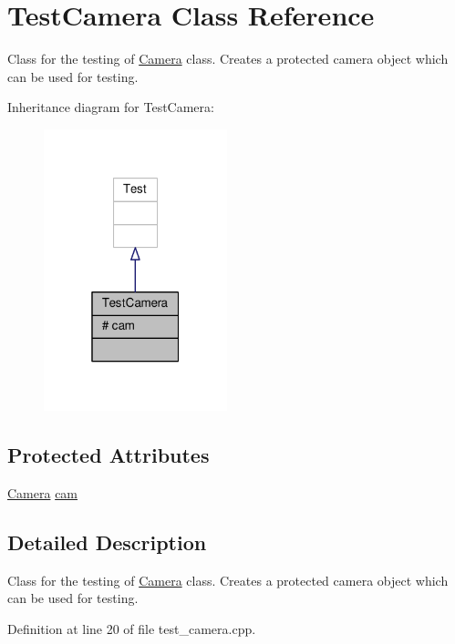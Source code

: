 \hypertarget{class_test_camera}{}\section{Test\+Camera Class Reference}
\label{class_test_camera}


Class for the testing of \hyperlink{class_camera}{Camera} class. Creates a protected camera object which can be used for testing.  




Inheritance diagram for Test\+Camera\+:
\nopagebreak
\begin{figure}[H]
\begin{center}
\leavevmode
\includegraphics[width=151pt]{class_test_camera__inherit__graph}
\end{center}
\end{figure}
\subsection*{Protected Attributes}
\begin{DoxyCompactItemize}
\item 
\hyperlink{class_camera}{Camera} \hyperlink{class_test_camera_ac1abc17c2f7f776456583bc3a60db3a9}{cam}
\end{DoxyCompactItemize}


\subsection{Detailed Description}
Class for the testing of \hyperlink{class_camera}{Camera} class. Creates a protected camera object which can be used for testing. 

Definition at line 20 of file test\+\_\+camera.\+cpp.



